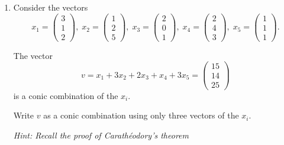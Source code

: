 \documentclass[11pt]{article}
\institute{\'Ecole Polytechnique F\'ed\'erale de Lausanne}
\begin{document}
\makeheader

\begin{enumerate}[1)]

\item Consider the vectors
$$ x_1 = \begin{pmatrix} 3 \\ 1 \\ 2\end{pmatrix},\; x_2 = \begin{pmatrix} 1 \\ 2 \\ 5 \end{pmatrix},\; x_3 = \begin{pmatrix} 2 \\ 0 \\ 1 \end{pmatrix},\; x_4 = \begin{pmatrix}  2 \\ 4 \\ 3 \end{pmatrix},\; x_5 = \begin{pmatrix}  1 \\ 1 \\ 1 \end{pmatrix}. $$

The vector 
$$ v= x_1 + 3 x_2 + 2 x_3 + x_4 + 3 x_5 =  \begin{pmatrix}  15\\ 14 \\ 25 \end{pmatrix} $$
is a conic combination of the $x_i$.

Write $v$ as a conic combination using only three vectors of the $x_i$.

\emph{Hint: Recall the proof of Carath\'eodory's theorem}


\end{enumerate}
\end{document}
